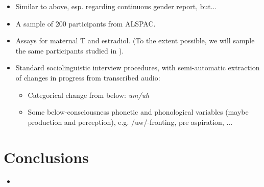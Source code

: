 \documentclass[a0,portrait]{a0poster}
\begin{document}
\begin{multicols}{2}
\begin{itemize}
	\item Similar to above, esp. regarding continuous gender report, but...
	\item A sample of 200 participants from ALSPAC.
	\item Assays for maternal T and estradiol. (To the extent possible, we will sample the same participants studied in \citealt{hinesetal2002}). 
	\item Standard sociolinguistic interview procedures, with semi-automatic extraction of changes in progress from transcribed audio:
	\begin{itemize}
		\item Categorical change from below: \textsl{um/uh}
		\item Some below-consciousness phonetic and phonological variables (maybe production and perception), e.g. /uw/-fronting, pre aspiration, ...
	\end{itemize}
\end{itemize}


\color{SaddleBrown} %

\section*{Conclusions}

\begin{itemize}
\item 
\end{itemize}

\color{DarkSlateGray} %






\end{multicols}
\end{document}
